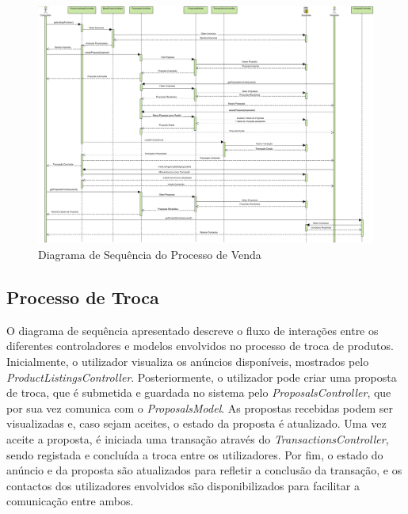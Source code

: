 \documentclass[a4paper, 12pt]{article} %
\begin{document}
\begin{figure}[ht]
	\centering
	\includegraphics[width=\textwidth]{../images/sequence-diagram-sale.png}
	\caption{Diagrama de Sequência do Processo de Venda}
	\label{fig:diagrama_sequencia_venda}
\end{figure}

\subsection{Processo de Troca}
O diagrama de sequência apresentado descreve o fluxo de interações entre os diferentes controladores e modelos envolvidos no processo de troca de produtos. Inicialmente, o utilizador visualiza os anúncios disponíveis, mostrados pelo \textit{ProductListingsController}. Posteriormente, o utilizador pode criar uma proposta de troca, que é submetida e guardada no sistema pelo \textit{ProposalsController}, que por sua vez comunica com o \textit{ProposalsModel}. As propostas recebidas podem ser visualizadas e, caso sejam aceites, o estado da proposta é atualizado. Uma vez aceite a proposta, é iniciada uma transação através do \textit{TransactionsController}, sendo registada e concluída a troca entre os utilizadores. Por fim, o estado do anúncio e da proposta são atualizados para refletir a conclusão da transação, e os contactos dos utilizadores envolvidos são disponibilizados para facilitar a comunicação entre ambos.
\end{document}
